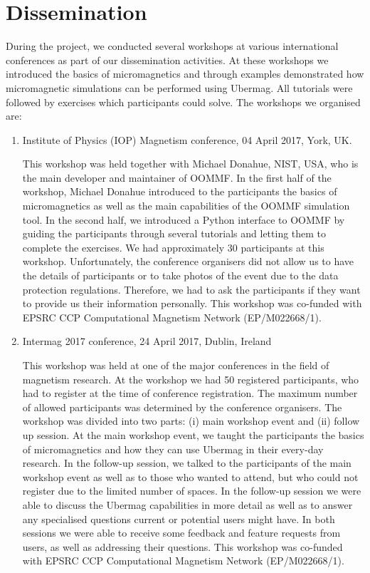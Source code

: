 \documentclass{deliverablereport}
\begin{document}
\section{Dissemination}

During the project, we conducted several workshops at various
international conferences as part of our dissemination activities. At
these workshops we introduced the basics of micromagnetics and through
examples demonstrated how micromagnetic simulations can be performed
using Ubermag. All tutorials were followed by exercises which
participants could solve. The workshops we organised are:

\begin{enumerate}

\item Institute of Physics (IOP) Magnetism conference, 04 April 2017,
York, UK.

  This workshop was held together with Michael Donahue, NIST, USA, who
is the main developer and maintainer of OOMMF. In the first half of
the workshop, Michael Donahue introduced to the participants the
basics of micromagnetics as well as the main capabilities of the OOMMF
simulation tool. In the second half, we introduced a Python interface
to OOMMF by guiding the participants through several tutorials and
letting them to complete the exercises. We had approximately 30
participants at this workshop. Unfortunately, the conference
organisers did not allow us to have the details of participants or to
take photos of the event due to the data protection
regulations. Therefore, we had to ask the participants if they want to
provide us their information personally. This workshop was co-funded
with EPSRC CCP Computational Magnetism Network (EP/M022668/1).

\item Intermag 2017 conference, 24 April 2017, Dublin, Ireland

  This workshop was held at one of the major conferences in the field
of magnetism research. At the workshop we had 50 registered
participants, who had to register at the time of conference
registration. The maximum number of allowed participants was
determined by the conference organisers. The workshop was divided into
two parts: (i) main workshop event and (ii) follow up session. At the
main workshop event, we taught the participants the basics of
micromagnetics and how they can use Ubermag in their every-day
research. In the follow-up session, we talked to the participants of
the main workshop event as well as to those who wanted to attend, but
who could not register due to the limited number of spaces. In the
follow-up session we were able to discuss the Ubermag capabilities in
more detail as well as to answer any specialised questions current or
potential users might have. In both sessions we were able to receive
some feedback and feature requests from users, as well as addressing
their questions. This workshop was
co-funded with EPSRC CCP Computational Magnetism Network
(EP/M022668/1).


\end{enumerate}
\end{document}
